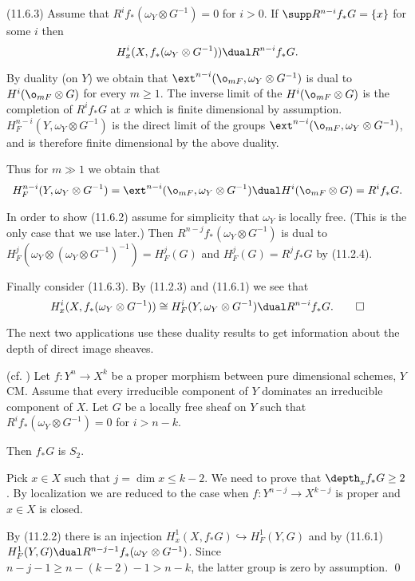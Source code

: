 (11.6.3) Assume that
 $R^if_*(\omega_Y\otimes G^{-1})=0$ for $i>0$. If
 $\supp R^{n-i}f_*G=\{x\}$ for some $i$ then
$$
H^i_x(X,f_*(\omega_Y\otimes G^{-1}))\dual R^{n-i}f_*G.
$$
\endproclaim

\demop By  duality (on $Y$) we obtain that
$\ext^{n-i}(\o_{mF},\omega_Y\otimes G^{-1})$ is dual to $H^i(\o_{mF}\otimes
G)$ for every
$m\geq 1$. The inverse limit of the $H^i(\o_{mF}\otimes G)$ is the
completion of
$R^if_*G$ at
$x$ which is   finite
dimensional by assumption.  
$H^{n-i}_F(Y,\omega_Y\otimes G^{-1})$ is the direct limit of the groups
$\ext^{n-i}(\o_{mF},\omega_Y\otimes G^{-1})$, and is therefore finite
dimensional by the above duality. 

Thus for $m\gg 1$ we obtain that 
$$
H^{n-i}_F(Y,\omega_Y\otimes G^{-1})=
\ext^{n-i}(\o_{mF},\omega_Y\otimes G^{-1})
\dual H^i(\o_{mF}\otimes G)
=R^if_*G.
$$

In order to show (11.6.2) assume for simplicity that $\omega_Y$ is locally
free. (This is the only case that we use later.)
Then $R^{n-j}f_*(\omega_Y\otimes G^{-1})$ is dual to 
$H^j_F(\omega_Y\otimes (\omega_Y\otimes G^{-1})^{-1})=
H^j_F( G)$ and  $H^j_F( G)=R^jf_*G$ by (11.2.4).

Finally consider (11.6.3). By (11.2.3) and (11.6.1) we see that  
$$
H^i_x(X,f_*(\omega_Y\otimes
G^{-1}))\cong H^i_F(Y,\omega_Y\otimes G^{-1})\dual R^{n-i}f_*G.\qed
  $$
\enddemo

The next two applications use these duality results to get information about the
depth of direct image sheaves.

 (cf. \cite{Fujita85}) Let $f:Y^n\to X^k$ be a proper
morphism between pure dimensional schemes, $Y$ CM. Assume that every irreducible
component of $Y$ dominates an irreducible component of $X$. Let $G$ be a locally
free sheaf on $Y$ such that  $R^if_*(\omega_Y\otimes G^{-1})=0$ for $i>n-k$.

Then $f_*G$ is $S_2$.
\endproclaim

\demop Pick $x\in X$ such that $j=\dim x\leq k-2$. We need to prove that
$\depth_xf_*G\geq 2$. By localization we are reduced to the case when 
$f:Y^{n-j}\to X^{k-j}$ is proper and $x\in X$ is closed.

By (11.2.2) there is an injection $H^1_x(X,f_*G)\hookrightarrow H^1_F(Y,G)$
and by (11.6.1) $H^1_F(Y,G)\dual R^{n-j-1}f_*(\omega_Y\otimes G^{-1})$.
Since  $n-j-1\geq n-(k-2)-1>n-k$, the latter group is zero by assumption.
\qed\enddemo







